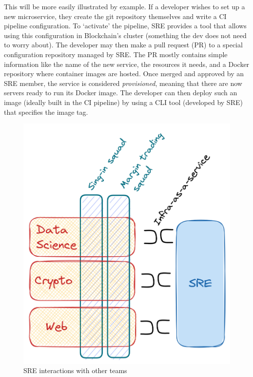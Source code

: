 \documentclass[conference]{IEEEtran}
\begin{document}
    This will be more easily illustrated by example.
    If a developer wishes to set up a new microservice, they create the git
    repository themselves and write a CI pipeline configuration.
    To `activate' the pipeline, SRE provides a tool that allows using this configuration in Blockchain's cluster (something the dev does not need to worry about).
    The developer may then make a pull request (PR) to a special configuration repository managed by SRE\@.
    The PR mostly contains simple information like the name of the new service, the resources it needs, and a Docker repository where container images are hosted.
    Once merged and approved by an SRE member, the service is considered \emph{provisioned}, meaning that there are now servers ready to run its Docker image.
    The developer can then deploy such an image (ideally built in the CI pipeline) by using a CLI tool (developed by SRE) that specifies the image tag.

    \begin{figure}[h]
        \centering
        \includegraphics[width=0.6\columnwidth]{sreAsAService}
        \caption{SRE interactions with other teams}
        \label{fig:sre}
    \end{figure}
\end{document}
